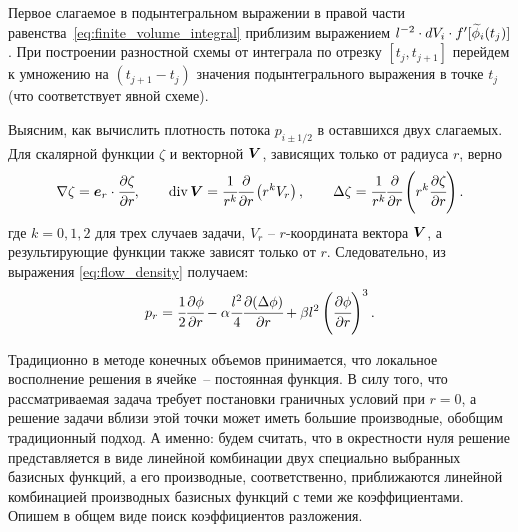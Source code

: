 Первое слагаемое в подынтегральном выражении в правой части равенства~\eqref{eq:finite_volume_integral} приблизим выражением $l^{-2} \cdot dV_i \cdot f'[{\widetilde{\phi}}_i(t_j)]$. При построении разностной схемы от интеграла по отрезку $[t_j, t_{j + 1}]$ перейдем к умножению на $(t_{j + 1} - t_j)$ значения подынтегрального выражения в точке $t_j$ (что соответствует явной схеме).

Выясним, как вычислить плотность потока $p_{i \pm 1/2}$ в оставшихся двух слагаемых. Для скалярной функции $\zeta$ и векторной $\boldsymbol{V}$, зависящих только от радиуса $r$, верно
\begin{equation}
    \nabla \zeta = \boldsymbol{e}_r \cdot \cfrac{\partial \zeta}{\partial r}, \qquad \operatorname{{div}} \boldsymbol{V} = \cfrac{1}{r^k} \cfrac{\partial }{\partial r} \left( r^k V_r \right), \qquad \Delta \zeta = \cfrac{1}{r^k} \cfrac{\partial }{\partial r} \left( r^k \cfrac{\partial \zeta}{\partial r} \right).
    \label{eq:differentiation_curved}
\end{equation}
где $k = 0,1,2$ для трех случаев задачи, $V_r$ -- $r$-координата вектора $\boldsymbol{V}$, а результирующие функции также зависят только от $r$. Следовательно, из выражения \eqref{eq:flow_density} получаем:
\begin{equation}
    p_r = \cfrac{1}{2} \cfrac{\partial \phi}{\partial r} - \alpha \cfrac{l^2}{4} \cfrac{\partial (\Delta \phi)}{\partial r} + \beta l^2 \left( \cfrac{\partial \phi}{\partial r} \right)^3.
    \label{eq:finite_volumes_density}
\end{equation}

Традиционно в методе конечных объемов принимается, что локальное восполнение решения в ячейке~-- постоянная функция. В силу того, что рассматриваемая задача требует постановки граничных условий при $r = 0$, а решение задачи вблизи этой точки может иметь большие производные, обобщим традиционный подход. А именно: будем считать, что в окрестности нуля решение представляется в виде линейной комбинации двух специально выбранных базисных функций, а его производные, соответственно, приближаются линейной комбинацией производных базисных функций с теми же коэффициентами. Опишем в общем виде поиск коэффициентов разложения.

